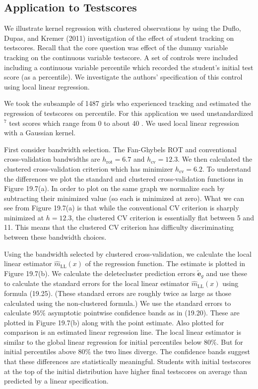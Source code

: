 \documentclass[10pt]{article}
\begin{document}
\subsection{Application to Testscores}
We illustrate kernel regression with clustered observations by using the Duflo, Dupas, and Kremer (2011) investigation of the effect of student tracking on testscores. Recall that the core question was effect of the dummy variable tracking on the continuous variable testscore. A set of controls were included including a continuous variable percentile which recorded the student's initial test score (as a percentile). We investigate the authors' specification of this control using local linear regression.

We took the subsample of 1487 girls who experienced tracking and estimated the regression of testscores on percentile. For this application we used unstandardized ${ }^{7}$ test scores which range from 0 to about 40 . We used local linear regression with a Gaussian kernel.

First consider bandwidth selection. The Fan-Ghybels ROT and conventional cross-validation bandwidths are $h_{\mathrm{rot}}=6.7$ and $h_{\mathrm{cv}}=12.3$. We then calculated the clustered cross-validation criterion which has minimizer $h_{\mathrm{cv}}=6.2$. To understand the differences we plot the standard and clustered cross-validation functions in Figure 19.7(a). In order to plot on the same graph we normalize each by subtracting their minimized value (so each is minimized at zero). What we can see from Figure 19.7(a) is that while the conventional CV criterion is sharply minimized at $h=12.3$, the clustered CV criterion is essentially flat between 5 and 11. This means that the clustered CV criterion has difficulty discriminating between these bandwidth choices.

Using the bandwidth selected by clustered cross-validation, we calculate the local linear estimator $\hat{m}_{\mathrm{LL}}(x)$ of the regression function. The estimate is plotted in Figure 19.7(b). We calculate the deletecluster prediction errors $\widetilde{\boldsymbol{e}}_{g}$ and use these to calculate the standard errors for the local linear estimator $\widehat{m}_{\mathrm{LL}}(x)$ using formula (19.25). (These standard errors are roughly twice as large as those calculated using the non-clustered formula.) We use the standard errors to calculate $95 \%$ asymptotic pointwise confidence bands as in (19.20). These are plotted in Figure 19.7(b) along with the point estimate. Also plotted for comparison is an estimated linear regression line. The local linear estimator is similar to the global linear regression for initial percentiles below $80 \%$. But for initial percentiles above $80 \%$ the two lines diverge. The confidence bands suggest that these differences are statistically meaningful. Students with initial testscores at the top of the initial distribution have higher final testscores on average than predicted by a linear specification.
\end{document}
